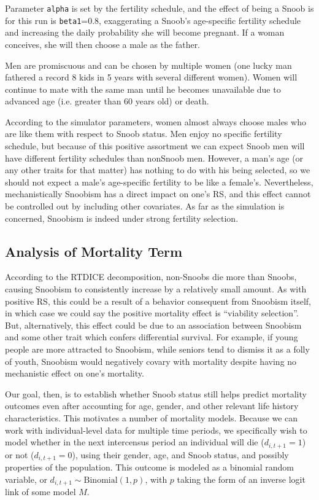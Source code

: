 Parameter \texttt{alpha} is set by the fertility schedule, and the effect of being a Snoob is for this run is \texttt{beta1}=0.8, exaggerating a Snoob's age-specific fertility schedule and increasing the daily probability she will become pregnant.  If a woman conceives, she will then choose a male as the father.  

Men are promiscuous and can be chosen by multiple women (one lucky man fathered a record 8 kids in 5 years with several different women).  Women will continue to mate with the same man until he becomes unavailable due to advanced age (i.e. greater than 60 years old) or death.

According to the simulator parameters, women almost always choose males who are like them with respect to Snoob status.  Men enjoy no specific fertility schedule, but because of this positive assortment we can expect Snoob men will have different fertility schedules than nonSnoob men.  However, a man's age (or any other traits for that matter) has nothing to do with his being selected, so we should not expect a male's age-specific fertility to be like a female's.  Nevertheless, mechanistically Snoobism has a direct impact on one's RS, and this effect cannot be controlled out by including other covariates.  As far as the simulation is concerned, Snoobism is indeed under strong fertility selection.


\subsection{Analysis of Mortality Term}

According to the RTDICE decomposition, non-Snoobs die more than Snoobs, causing Snoobism to consistently increase by a relatively small amount.  As with positive RS, this could be a result of a behavior consequent from Snoobism itself, in which case we could say the positive mortality effect is ``viability selection''.  But, alternatively, this effect could be due to an association between Snoobism and some other trait which confers differential survival.  For example, if young people are more attracted to Snoobism, while seniors tend to dismiss it as a folly of youth, Snoobism would negatively covary with mortality despite having no mechanistic effect on one's mortality.
                            
Our goal, then, is to establish whether Snoob status still helps predict mortality outcomes even after accounting for age, gender, and other relevant life history characteristics.  This motivates a number of mortality models.  Because we can work with individual-level data for multiple time periods, we specifically wish to model whether in the next intercensus period an individual will die ($d_{i,t+1} = 1$) or not ($d_{i,t+1}=0$), using their gender, age, and Snoob status, and possibly properties of the population.  This outcome is modeled as a binomial random variable, or $d_{i,t+1} \sim \mathrm{Binomial}(1,p)$, with $p$ taking the form of an inverse logit link of some model $M$.

